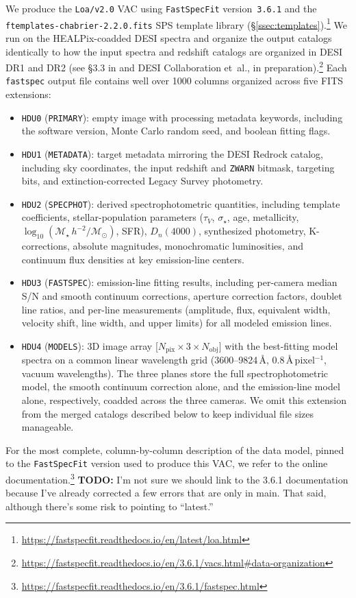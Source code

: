 \documentclass[modern,linenumbers]{aastex701}
\newcommand{\todo}[1]{{\color{red}\textbf{TODO:} #1}}
\newcommand{\fastspecfit}{\texttt{FastSpecFit}}
\newcommand{\fastspec}{\texttt{fastspec}}
\newcommand{\vdisp}{\ensuremath{\sigma_\star}}
\newcommand{\Mstar}{\ensuremath{\mathcal{M}_{\star}}}
\newcommand{\msun}{\ensuremath{\mathcal{M}_{\odot}}}
\newcommand{\logmstar}{\ensuremath{\log_{10}(\Mstar\,h^{-2}/\msun)}}
\begin{document}
We produce the \texttt{Loa/v2.0} VAC using \fastspecfit{}
version~\texttt{3.6.1} and the \texttt{ftemplates-chabrier-2.2.0.fits}
SPS template library
(\S\ref{ssec:templates}).\footnote{\url{https://fastspecfit.readthedocs.io/en/latest/loa.html}}
We run on the HEALPix-coadded DESI spectra and organize the output
catalogs identically to how the input spectra and redshift catalogs
are organized in DESI DR1 and DR2 (see \S3.3 in
\citealt{desi-collaboration26a} and DESI Collaboration et~al., in
preparation).\footnote{\url{https://fastspecfit.readthedocs.io/en/3.6.1/vacs.html\#data-organization}}
Each \fastspec{} output file contains well over 1000 columns organized
across five FITS extensions:
\begin{itemize}
  \item \texttt{HDU0} (\texttt{PRIMARY}): empty image with processing
    metadata keywords, including the software version, Monte Carlo
    random seed, and boolean fitting flags.
  \item \texttt{HDU1} (\texttt{METADATA}): target metadata mirroring
    the DESI Redrock catalog, including sky coordinates, the input
    redshift and \texttt{ZWARN} bitmask, targeting bits, and
    extinction-corrected Legacy Survey photometry.
  \item \texttt{HDU2} (\texttt{SPECPHOT}): derived spectrophotometric
    quantities, including template coefficients, stellar-population
    parameters ($\tau_V$, $\vdisp$, age, metallicity, $\logmstar$,
    SFR), $D_n(4000)$, synthesized photometry, K-corrections, absolute
    magnitudes, monochromatic luminosities, and continuum flux
    densities at key emission-line centers.
  \item \texttt{HDU3} (\texttt{FASTSPEC}): emission-line fitting
    results, including per-camera median S/N and smooth continuum
    corrections, aperture correction factors, doublet line ratios, and
    per-line measurements (amplitude, flux, equivalent width, velocity
    shift, line width, and upper limits) for all modeled emission
    lines.
  \item \texttt{HDU4} (\texttt{MODELS}): 3D image array
    [$N_\mathrm{pix} \times 3 \times N_\mathrm{obj}$] with the
    best-fitting model spectra on a common linear wavelength grid
    (3600--9824\,\AA, $0.8$\,\AA\,pixel$^{-1}$, vacuum
    wavelengths). The three planes store the full spectrophotometric
    model, the smooth continuum correction alone, and the
    emission-line model alone, respectively, coadded across the three
    cameras. We omit this extension from the merged catalogs described
    below to keep individual file sizes manageable.
\end{itemize}
\noindent For the most complete, column-by-column description of the
data model, pinned to the \fastspecfit{} version used to produce this
VAC, we refer to the online
documentation.\footnote{\url{https://fastspecfit.readthedocs.io/en/3.6.1/fastspec.html}}
\todo{I'm not sure we should link to the 3.6.1 documentation because
  I've already corrected a few errors that are only in main. That
  said, although there's some risk to pointing to ``latest.''}
\end{document}
